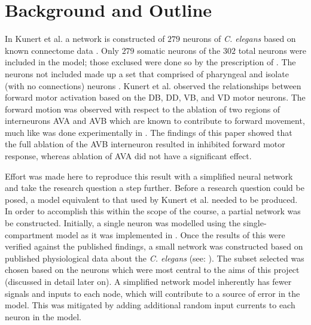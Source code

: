\documentclass[11pt]{article} %
\begin{document}
\section{Background and Outline}
In Kunert et al. \cite{Kunert2014} a network is constructed of $279$ neurons of \emph{C. elegans} based on known connectome data \cite{Varshney2011}. Only $279$ somatic neurons of the $302$ total neurons \cite{Sulston1977} were included in the model; those exclused were done so by the prescription of \cite{Varshney2011}. The neurons not included made up a set that comprised of pharyngeal and isolate (with no connections) neurons \cite{Varshney2011}. Kunert et al. observed the relationships between forward motor activation based on the DB, DD, VB, and VD motor neurons. The forward motion was observed with respect to the ablation of two regions of interneurons AVA and AVB \cite{Kunert 2014} which are known to contribute to forward movement, much like was done experimentally in \cite{Chalfie1985}. The findings of this paper showed that the full ablation of the AVB interneuron resulted in inhibited forward motor response, whereas ablation of AVA did not have a significant effect.

Effort was made here to reproduce this result with a simplified neural network and take the research question a step further. Before a research question could be posed, a model equivalent to that used by Kunert et al. needed to be produced. In order to accomplish this within the scope of the course, a partial network was be constructed. Initially, a single neuron was modelled using the single-compartment model \cite{Wicks1996a} as it was implemented in \cite{Kunert2014}. Once the results of this were verified against the published findings, a small network was constructed based on published physiological data about the \emph{C. elegans} (see: \cite{Wicks1996a, Varshney2011, Sulston1977, Oshio2003}). The subset selected was chosen based on the neurons which were most central to the aims of this project (discussed in detail later on). A simplified network model inherently has fewer signals and inputs to each node, which will contribute to a source of error in the model. This was mitigated by adding additional random input currents to each neuron in the model.
\end{document}
